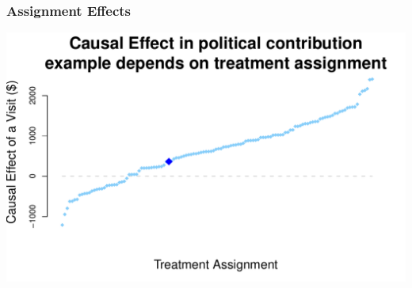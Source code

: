 \documentclass[aspectratio=169]{beamer}
\theoremstyle{principle}
\begin{document}
\begin{frame}
\frametitle{Assignment Effects}
\begin{center}
\includegraphics[scale=0.6]{assignment_effects.pdf}
\end{center}
\end{frame}
\end{document}
